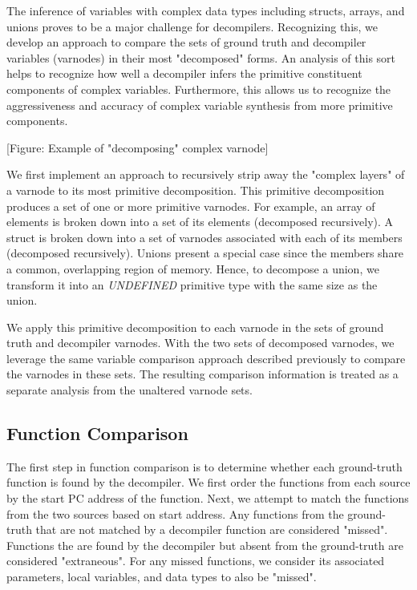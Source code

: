 The inference of variables with complex data types including structs, arrays, and unions proves to be a major challenge for decompilers. Recognizing this, we develop an approach to compare the sets of ground truth and decompiler variables (varnodes) in their most "decomposed" forms. An analysis of this sort helps to recognize how well a decompiler infers the primitive constituent components of complex variables. Furthermore, this allows us to recognize the aggressiveness and accuracy of complex variable synthesis from more primitive components.

[Figure: Example of "decomposing" complex varnode]

We first implement an approach to recursively strip away the "complex layers" of a varnode to its most primitive decomposition. This primitive decomposition produces a set of one or more primitive varnodes. For example, an array of elements is broken down into a set of its elements (decomposed recursively). A struct is broken down into a set of varnodes associated with each of its members (decomposed recursively). Unions present a special case since the members share a common, overlapping region of memory. Hence, to decompose a union, we transform it into an \emph{UNDEFINED} primitive type with the same size as the union.

We apply this primitive decomposition to each varnode in the sets of ground truth and decompiler varnodes. With the two sets of decomposed varnodes, we leverage the same variable comparison approach described previously to compare the varnodes in these sets. The resulting comparison information is treated as a separate analysis from the unaltered varnode sets.

\subsection{Function Comparison}

The first step in function comparison is to determine whether each ground-truth function is found by the decompiler. We first order the functions from each source by the start PC address of the function. Next, we attempt to match the functions from the two sources based on start address. Any functions from the ground-truth that are not matched by a decompiler function are considered "missed". Functions the are found by the decompiler but absent from the ground-truth are considered "extraneous". For any missed functions, we consider its associated parameters, local variables, and data types to also be "missed".

